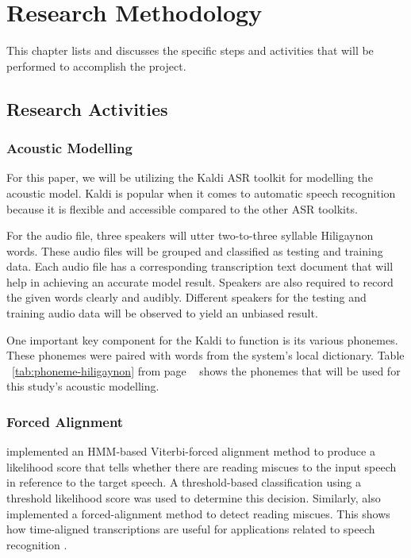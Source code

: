 \chapter{Research Methodology}
This chapter lists and discusses the specific steps and activities that will be performed to accomplish the project.

\section{Research Activities}
\subsection{Acoustic Modelling}
For this paper, we will be utilizing the Kaldi ASR toolkit for modelling the acoustic model. Kaldi is popular when it comes to automatic speech recognition because it is flexible and accessible compared to the other ASR toolkits. 

For the audio file, three speakers will utter two-to-three syllable Hiligaynon words. These audio files will be grouped and classified as testing and training data. Each audio file has a corresponding transcription text document that will help in achieving an accurate model result. Speakers are also required to record the given words clearly and audibly. Different speakers for the testing and training audio data will be observed to yield an unbiased result.

One important key component for the Kaldi to function is its various phonemes. These phonemes were paired with words from the system’s local dictionary. Table ~\ref{tab:phoneme-hiligaynon} from page ~\pageref{tab:phoneme-hiligaynon} shows the phonemes that will be used for this study's acoustic modelling.

\subsection{Forced Alignment}
\citeauthor{pascual-2017} \citeyear{pascual-2017} implemented an HMM-based Viterbi-forced alignment method to produce a likelihood score that tells whether there are reading miscues to the input speech in reference to the target speech. A threshold-based classification using a threshold likelihood score was used to determine this decision. Similarly, \citeauthor{rasmussen-2009} \citeyear{rasmussen-2009} also implemented a forced-alignment method to detect reading miscues. This shows how time-aligned transcriptions are useful for applications related to speech recognition \cite{dimzon-2020}.

